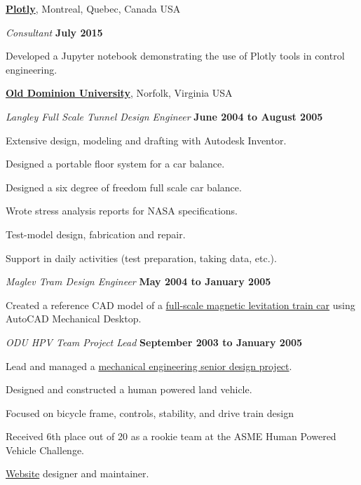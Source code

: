\documentclass[10pt]{article}
\newenvironment{outerlist}[1][\enskip\textbullet]%
        {\begin{itemize}[#1]}{\end{itemize}%
         \vspace{-.6\baselineskip}}
\newenvironment{innerlist}[1][\enskip\textbullet]%
        {\begin{compactitem}[#1]}{\end{compactitem}}
\newcommand{\blankline}{\quad\pagebreak[2]}
\begin{document}
\blankline

\href{http://www.plotly.com}{\textbf{Plotly}}, Montreal, Quebec, Canada
USA
\begin{outerlist}
  \item[] \textit{Consultant}%
    \hfill \textbf{July 2015}
  \begin{innerlist}
    \item Developed a Jupyter notebook demonstrating the use of Plotly tools in
      control engineering.
      \href{https://plot.ly/ipython-notebooks/bicycle-control-design/}{}
  \end{innerlist}
\end{outerlist}

\blankline

\href{http://www.odu.edu}{\textbf{Old Dominion University}}, Norfolk, Virginia USA
\begin{outerlist}
  \item[] \textit{Langley Full Scale Tunnel Design Engineer}%
    \hfill \textbf{June 2004 to August 2005}
  \begin{innerlist}
    \item Extensive design, modeling and drafting with Autodesk Inventor.
    \item Designed a portable floor system for a car balance.
    \item Designed a six degree of freedom full scale car balance.
    \item Wrote stress analysis reports for NASA specifications.
    \item Test-model design, fabrication and repair.
    \item Support in daily activities (test preparation, taking data, etc.).
  \end{innerlist}

  \item[] \textit{Maglev Tram Design Engineer}%
    \hfill \textbf{May 2004 to January 2005}
  \begin{innerlist}
    \item Created a reference CAD model of a
      \href{http://ww2.eng.odu.edu/maglev/}{full-scale magnetic levitation
      train car} using AutoCAD Mechanical Desktop.
  \end{innerlist}

  \item[] \textit{ODU HPV Team Project Lead}%
    \hfill \textbf{September 2003 to January 2005}
  \begin{innerlist}
    \item Lead and managed a
      \href{http://www.lions.odu.edu/~dlandman/hpv/}{mechanical engineering
      senior design project}.
    \item Designed and constructed a human powered land vehicle.
    \item Focused on bicycle frame, controls, stability, and drive train design
    \item Received 6th place out of 20 as a rookie team at the ASME Human
        Powered Vehicle Challenge.
    \item \href{http://www.lions.odu.edu/~dlandman/hpv/}{Website} designer
      and maintainer.
  \end{innerlist}


\end{outerlist}
\end{document}
